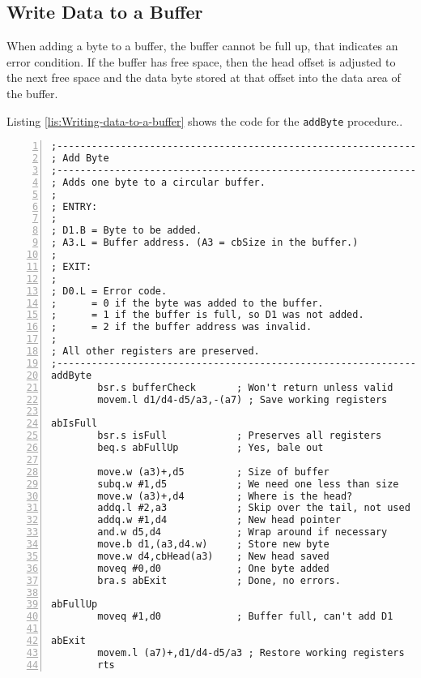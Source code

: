 \subsection{Write Data to a Buffer}

When adding a byte to a buffer, the buffer cannot be full up, that
indicates an error condition. If the buffer has free space, then the
head offset is adjusted to the next free space and the data byte stored
at that offset into the data area of the buffer.

Listing \ref{lis:Writing-data-to-a-buffer} shows the code for the
\texttt{addByte} procedure..

\begin{lstlisting}[caption={Writing data to a buffer},label={lis:Writing-data-to-a-buffer},numbers=left,showstringspaces=false,tabsize=4]
;--------------------------------------------------------------
; Add Byte
;--------------------------------------------------------------
; Adds one byte to a circular buffer.
; 
; ENTRY:
;
; D1.B = Byte to be added.
; A3.L = Buffer address. (A3 = cbSize in the buffer.)
;
; EXIT:
;
; D0.L = Error code.
;      = 0 if the byte was added to the buffer.
;      = 1 if the buffer is full, so D1 was not added.
;      = 2 if the buffer address was invalid.
;
; All other registers are preserved.
;--------------------------------------------------------------
addByte
        bsr.s bufferCheck       ; Won't return unless valid
        movem.l d1/d4-d5/a3,-(a7) ; Save working registers

abIsFull
        bsr.s isFull            ; Preserves all registers
        beq.s abFullUp          ; Yes, bale out        

        move.w (a3)+,d5         ; Size of buffer
        subq.w #1,d5            ; We need one less than size
        move.w (a3)+,d4         ; Where is the head?
        addq.l #2,a3            ; Skip over the tail, not used
        addq.w #1,d4            ; New head pointer
        and.w d5,d4             ; Wrap around if necessary
        move.b d1,(a3,d4.w)     ; Store new byte
        move.w d4,cbHead(a3)    ; New head saved
        moveq #0,d0             ; One byte added
        bra.s abExit            ; Done, no errors.

abFullUp
        moveq #1,d0             ; Buffer full, can't add D1

abExit
        movem.l (a7)+,d1/d4-d5/a3 ; Restore working registers
        rts

\end{lstlisting}

